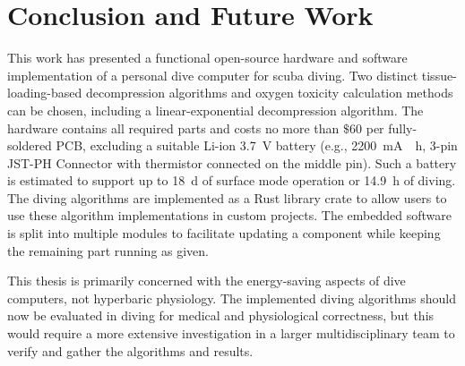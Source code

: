 
\chapter{Conclusion and Future Work}

This work has presented a functional open-source hardware and software implementation of a personal dive computer for \gls{scuba} diving. 
Two distinct tissue-loading-based decompression algorithms and oxygen toxicity calculation methods can be chosen, including a linear-exponential decompression algorithm.
The hardware contains all required parts and costs no more than $\$60$ per fully-soldered PCB, excluding a suitable Li-ion \SI{3.7}{\volt} battery (e.g., \SI{2200}{\milli\ampere{}\hour}, 3-pin JST-PH Connector with thermistor connected on the middle pin). 
Such a battery is estimated to support up to \SI{18}{\day} of surface mode operation or \SI{14.9}{\hour} of diving.
The diving algorithms are implemented as a Rust library crate to allow users to use these algorithm implementations in custom projects.
The embedded software is split into multiple modules to facilitate updating a component while keeping the remaining part running as given.

This thesis is primarily concerned with the energy-saving aspects of dive computers, not hyperbaric physiology.
The implemented diving algorithms should now be evaluated in diving for medical and physiological correctness, but this would require a more extensive investigation in a larger multidisciplinary team to verify and gather the algorithms and results.

